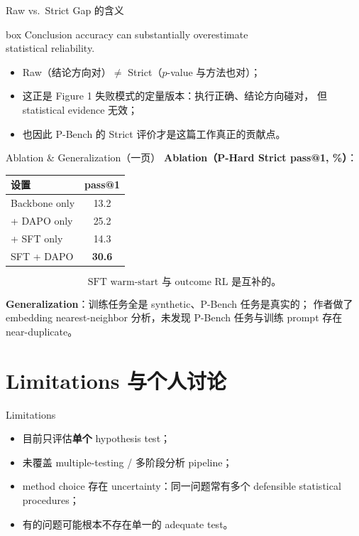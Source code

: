 \documentclass[aspectratio=169]{ctexbeamer}
\begin{document}
\begin{frame}{Raw vs.\ Strict Gap 的含义}
  \begin{beamercolorbox}[center, sep=10pt]{box}
    \Large Conclusion accuracy can substantially overestimate\\
    statistical reliability.
  \end{beamercolorbox}

  \medskip
  \begin{itemize}
    \item Raw（结论方向对）$\neq$ Strict（$p$-value 与方法也对）；
    \item 这正是 Figure 1 失败模式的定量版本：执行正确、结论方向碰对，
          但 statistical evidence 无效；
    \item 也因此 P-Bench 的 Strict 评价才是这篇工作真正的贡献点。
  \end{itemize}
\end{frame}

\begin{frame}{Ablation \& Generalization（一页）}
  \textbf{Ablation（P-Hard Strict pass@1, \%）}：
  \begin{center}
  \begin{tabular}{l c}
    \toprule
    设置 & pass@1 \\
    \midrule
    Backbone only          & 13.2 \\
    + DAPO only            & 25.2 \\
    + SFT only             & 14.3 \\
    SFT + DAPO             & \textbf{30.6} \\
    \bottomrule
  \end{tabular}
  \end{center}
  \[
    \boxed{\text{SFT warm-start 与 outcome RL 是互补的。}}
  \]

  \medskip
  \textbf{Generalization}：训练任务全是 synthetic、P-Bench 任务是真实的；
  作者做了 embedding nearest-neighbor 分析，未发现 P-Bench 任务与训练
  prompt 存在 near-duplicate。
\end{frame}

\section{Limitations 与个人讨论}

\begin{frame}{Limitations}
  \begin{itemize}
    \item 目前只评估\textbf{单个} hypothesis test；
    \item 未覆盖 multiple-testing / 多阶段分析 pipeline；
    \item method choice 存在 uncertainty：同一问题常有多个 defensible
          statistical procedures；
    \item 有的问题可能根本不存在单一的 adequate test。
  \end{itemize}
\end{frame}
\end{document}
